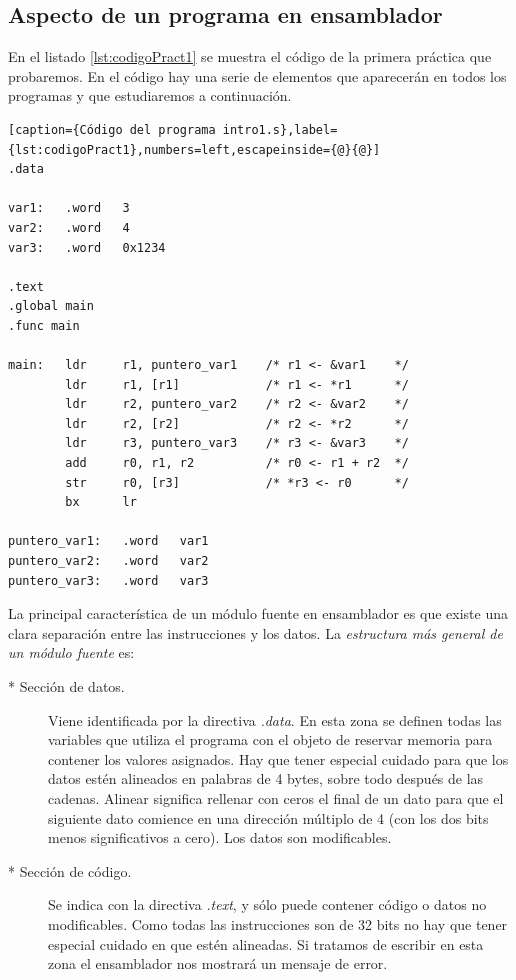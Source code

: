 \subsection{Aspecto de un programa en ensamblador}

En el listado \ref{lst:codigoPract1} se muestra el código de la primera
práctica que probaremos. En el código hay una serie de elementos que
aparecerán en todos los programas y que estudiaremos a continuación.

\begin{lstlisting}[caption={Código del programa intro1.s},label={lst:codigoPract1},numbers=left,escapeinside={@}{@}]
.data

var1:   .word   3
var2:   .word   4
var3:   .word   0x1234

.text
.global main
.func main
 
main:   ldr     r1, puntero_var1    /* r1 <- &var1    */
        ldr     r1, [r1]            /* r1 <- *r1      */
        ldr     r2, puntero_var2    /* r2 <- &var2    */
        ldr     r2, [r2]            /* r2 <- *r2      */
        ldr     r3, puntero_var3    /* r3 <- &var3    */
        add     r0, r1, r2          /* r0 <- r1 + r2  */
        str     r0, [r3]            /* *r3 <- r0      */
        bx      lr

puntero_var1:   .word   var1
puntero_var2:   .word   var2
puntero_var3:   .word   var3
\end{lstlisting}

La principal característica de un módulo fuente en ensamblador es
que existe una clara separación entre las instrucciones y los
datos. La {\it estructura más general de un módulo fuente} es:

\begin{description}
     \item[* Sección de datos.] Viene identificada por la directiva {\it .data}.
En esta zona se definen todas las variables que utiliza el programa
con el objeto de reservar memoria para contener los valores asignados. Hay que
tener especial cuidado para que los datos estén alineados en palabras de 4 bytes,
sobre todo después de las cadenas. Alinear significa rellenar con ceros el final
de un dato para que el siguiente dato comience en una dirección múltiplo de 4 (con
los dos bits menos significativos a cero). Los datos son modificables.

     \item[* Sección de código.] Se indica con la directiva {\it .text}, y sólo
puede contener código o datos no modificables. Como todas las instrucciones son
de 32 bits no hay que tener especial cuidado en que estén alineadas. Si tratamos
de escribir en esta zona el ensamblador nos mostrará un mensaje de error.
\end{description}

